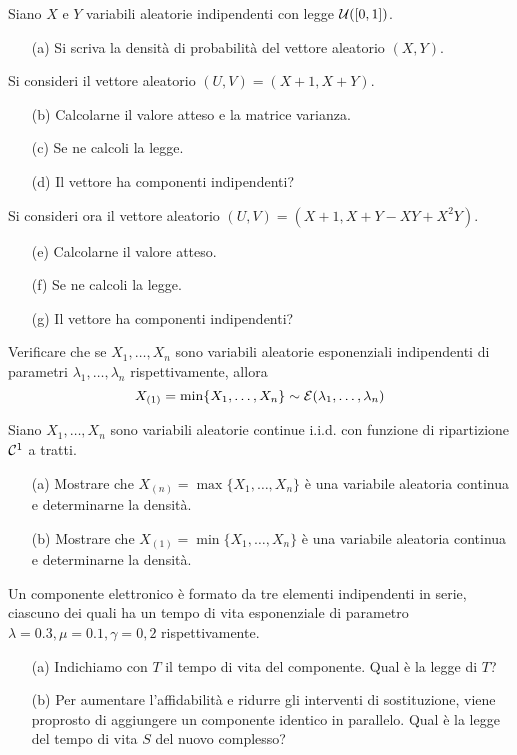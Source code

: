 \Esercizio{}
Siano $X$ e $Y$ variabili aleatorie indipendenti con legge $\mathcal{U}([0,1])$.
\begin{enumerate}
\item [(a)] Si scriva la densità di probabilità del vettore aleatorio $(X,Y)$.
\end{enumerate}
Si consideri il vettore aleatorio $(U,V)=(X+1,X+Y)$.
\begin{enumerate}
\item [(b)] Calcolarne il valore atteso e la matrice varianza.
\item [(c)] Se ne calcoli la legge.
\item [(d)] Il vettore ha componenti indipendenti?
\end{enumerate}
Si consideri ora il vettore aleatorio $(U,V)=(X+1,X+Y-XY+X^2Y)$.
\begin{enumerate}
\item [(e)] Calcolarne il valore atteso.
\item [(f)] Se ne calcoli la legge.
\item [(g)] Il vettore ha componenti indipendenti?
\end{enumerate}

\Esercizio{} %
Verificare che se $X_1,\dots,X_n$ sono variabili aleatorie esponenziali indipendenti di parametri $\lambda_1,\dots,\lambda_n$ rispettivamente, allora
\[
X_{(1)}=\min\{X_1,\dots,X_n  \}\sim\mathcal{E}(\lambda_1,\dots,\lambda_n)
\]

\Esercizio{} %
Siano $X_1,\dots,X_n$ sono variabili aleatorie continue i.i.d. con funzione di ripartizione $\mathcal{C}^1$ a tratti. 
\begin{enumerate}
\item [(a)] Mostrare che $X_{(n)}=\max\{ X_1,\dots,X_n \}$ è una variabile aleatoria continua e determinarne la densità.
\item [(b)] Mostrare che $X_{(1)}=\min\{ X_1,\dots,X_n \}$ è una variabile aleatoria continua e determinarne la densità.
\end{enumerate}

\Esercizio{}
Un componente elettronico è formato da tre elementi indipendenti in serie, ciascuno dei quali ha un tempo di vita esponenziale di parametro $\lambda=0.3,\mu=0.1,\gamma=0,2$ rispettivamente.
\begin{enumerate}
\item [(a)] Indichiamo con $T$ il tempo di vita del componente. Qual è la legge di $T$?
\item [(b)] Per aumentare l'affidabilità e ridurre gli interventi di sostituzione, viene proprosto di aggiungere un componente identico in parallelo. Qual è la legge del tempo di vita $S$ del nuovo complesso?
\end{enumerate}

